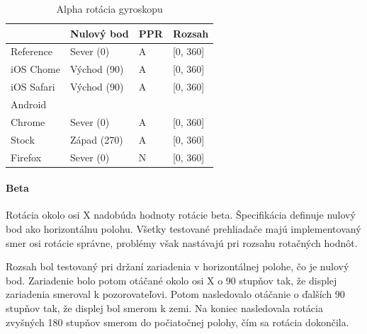 \begin{table}[H]
  \begin{tabular}{ | l | l | l | l |}
  \hline
              & Nulový bod  & PPR   & Rozsah \\ \hline
  Reference   & Sever (0)   & A     & [0, 360] \\  
  iOS Chome   & Východ (90)   & A     & [0, 360] \\  
  iOS Safari  & Východ (90)   & A     & [0, 360] \\  
  Android & & & \\  
  Chrome      & Sever (0)   & A     & [0, 360] \\  
  Stock       & Západ (270)  & A     & [0, 360] \\  
  Firefox     & Sever (0)   & N     & [0, 360] \\
  \hline
  \end{tabular}
  \caption[Alpha rotácia gyroskopu]{Alpha rotácia gyroskopu}
\end{table}



\paragraph{Beta} %
\label{par:beta}

Rotácia okolo osi X nadobúda hodnoty rotácie beta. Špecifikácia definuje nulový bod ako horizontálnu polohu. Všetky testované prehliadače majú implementovaný smer osi rotácie správne, problémy však nastávajú pri rozsahu rotačných hodnôt.

Rozsah bol testovaný pri držaní zariadenia v horizontálnej polohe, čo je nulový bod. Zariadenie bolo potom otáčané okolo osi X o 90 stupňov tak, že displej zariadenia smeroval k pozorovateľovi. Potom nasledovalo otáčanie o ďalších 90 stupňov tak, že displej bol smerom k zemi. Na koniec nasledovala rotácia zvyšných 180 stupňov smerom do počiatočnej polohy, čím sa rotácia dokončila.


